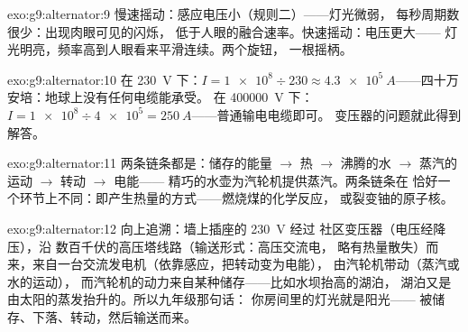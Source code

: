 \begin{solution}{exo:g9:alternator:9}
慢速摇动：感应电压小（规则二）——灯光微弱，
每秒周期数很少：出现肉眼可见的闪烁，
低于人眼的融合速率。快速摇动：电压更大——
灯光明亮，频率高到人眼看来平滑连续。两个旋钮，
一根摇柄。
\end{solution}

\begin{solution}{exo:g9:alternator:10}
在 \qty{230}{V} 下：$I = \num{1e8} \div 230 \approx
\qty{4.3e5}{A}$——四十万安培：地球上没有任何电缆能承受。
在 \qty{400000}{V} 下：$I = \num{1e8} \div
\num{4e5} = \qty{250}{A}$——普通输电电缆即可。
变压器的问题就此得到解答。
\end{solution}

\begin{solution}{exo:g9:alternator:11}
两条链条都是：储存的能量 $\to$ 热 $\to$ 沸腾的水
$\to$ 蒸汽的运动 $\to$ 转动 $\to$ 电能——
精巧的水壶为汽轮机提供蒸汽。两条链条在
恰好一个环节上不同：即产生热量的方式——燃烧煤的化学反应，
或裂变铀的原子核。
\end{solution}

\begin{solution}{exo:g9:alternator:12}
向上追溯：墙上插座的 \qty{230}{V} 经过
社区变压器（电压经降压），沿
数百千伏的高压塔线路（输送形式：高压交流电，
略有热量散失）而来，来自一台交流发电机（依靠感应，把转动变为电能），
由汽轮机带动（蒸汽或水的运动），
而汽轮机的动力来自某种储存——比如水坝抬高的湖泊，
湖泊又是由太阳的蒸发抬升的。所以九年级那句话：
你房间里的灯光就是阳光——
被储存、下落、转动，然后输送而来。
\end{solution}

